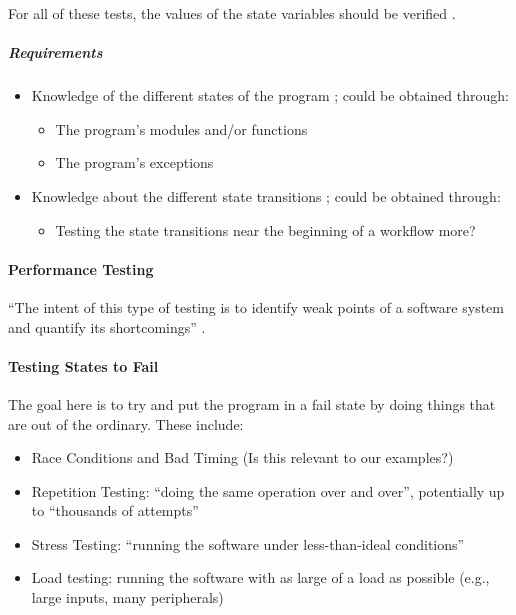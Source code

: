 For all of these tests, the values of the state variables should be verified
\cite[p.~83]{patton_software_2006}.

\subparagraph{Requirements}
\begin{itemize}
      \item Knowledge of the different states of the program
            \cite[p.~82]{patton_software_2006}; could be obtained through:
            \begin{itemize}
                  \item The program's modules and/or functions
                  \item The program's exceptions
            \end{itemize}
      \item Knowledge about the different state transitions
            \cite[p.~82]{patton_software_2006}; could be obtained through:
            \begin{itemize}
                  \item Testing the state transitions near the beginning of a
                        workflow more?
            \end{itemize}
\end{itemize}

\paragraph{Performance Testing}

``The intent of this type of testing is to identify weak points of a software
system and quantify its shortcomings'' \cite[p.~447]{peters_software_2000}.

\paragraph{Testing States to Fail \cite[p.~84-87]{patton_software_2006}}

The goal here is to try and put the program in a fail state by doing things
that are out of the ordinary. These include:

\begin{itemize}
      \item Race Conditions and Bad Timing \cite[p.~85-86]{patton_software_2006}
            (Is this relevant to our examples?)
      \item Repetition Testing: ``doing the same operation over and over'',
            potentially up to ``thousands of attempts''
            \cite[p.~86]{patton_software_2006}
      \item Stress Testing: ``running the software under less-than-ideal
            conditions'' \cite[p.~86]{patton_software_2006}
      \item Load testing: running the software with as large of a load as
            possible (e.g., large inputs, many peripherals)
            \cite[p.~86]{patton_software_2006}
\end{itemize}

